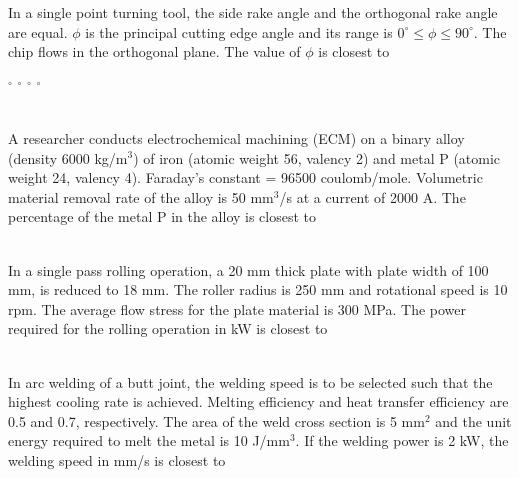 \documentclass[addpoints,11pt]{exam}
\begin{document}
\begin{questions}
    \question In a single point turning tool, the side rake angle and the orthogonal rake angle are equal. $\phi$ is the principal cutting edge angle and its range is $0^\circ \le \phi \le 90^\circ$. The chip flows in the orthogonal plane. The value of $\phi$ is closest to\\

    \begin{oneparchoices}
        $^\circ$
        $^\circ$
        $^\circ$
        $^\circ$
    \end{oneparchoices}\\

    \question A researcher conducts electrochemical machining (ECM) on a binary alloy (density 6000 kg/m$^3$) of iron (atomic weight 56, valency 2) and metal P (atomic weight 24, valency 4). Faraday's constant = 96500 coulomb/mole. Volumetric material removal rate of the alloy is 50 mm$^3$/s at a current of 2000 A. The percentage of the metal P in the alloy is closest to\\

    \begin{oneparchoices}
    \end{oneparchoices}\\

    \question In a single pass rolling operation, a 20 mm thick plate with plate width of 100 mm, is reduced to 18 mm. The roller radius is 250 mm and rotational speed is 10 rpm. The average flow stress for the plate material is 300 MPa. The power required for the rolling operation in kW is closest to\\

    \begin{oneparchoices}
    \end{oneparchoices}\\

    \question In arc welding of a butt joint, the welding speed is to be selected such that the highest cooling rate is achieved. Melting efficiency and heat transfer efficiency are 0.5 and 0.7, respectively. The area of the weld cross section is 5 mm$^2$ and the unit energy required to melt the metal is 10 J/mm$^3$. If the welding power is 2 kW, the welding speed in mm/s is closest to\\

    \begin{oneparchoices}
    \end{oneparchoices}\\


\end{questions}
\end{document}
